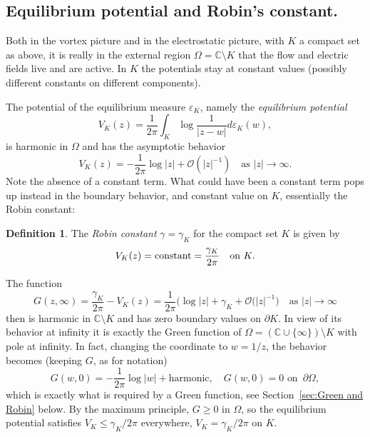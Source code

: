 \documentclass[reqno,12pt]{article}
\theoremstyle{plain}
\theoremstyle{definition}
\newtheorem{definition}{Definition}[section]
\numberwithin{equation}{section}
\numberwithin{figure}{section}
\def\C{{\mathbb C}}
\begin{document}
\subsection{Equilibrium potential and Robin's constant.}\label{sec:equilibrium potential}

Both in the vortex picture and in the electrostatic picture, with $K$ a compact set as above, 
it is really in the external region $\Omega=\C\setminus K$
that the flow and electric fields live and are active. In $K$ the potentials stay at constant values
(possibly different constants on different components).

The potential of the equilibrium measure
$\varepsilon_K$, namely the  {\it equilibrium potential} 
\begin{equation}\label{epsilonK}
V_K(z)=\frac{1}{2\pi} \int_K \log \frac{1}{|z-w|} d\varepsilon_K(w),
\end{equation}
is harmonic in $\Omega$ and has the asymptotic behavior
$$
V_K(z)=-\frac{1}{2\pi}\log |z|+\mathcal{O}(|z|^{-1}) \quad \text{as}\,\,|z|\to\infty.
$$
Note the absence of a constant term. What could have been a constant term pops up instead in the boundary 
behavior, and constant value on $K$, essentially the Robin constant:
\begin{definition}\label{def:robin}
The {\it Robin constant} $\gamma=\gamma_K$ for the compact set $K$ is given by
\begin{equation}\label{VK}
V_K(z)= {\rm constant}=\frac{\gamma_K}{2\pi} \quad \text{on}\,\, K.
\end{equation}
\end{definition}

The function 
\begin{equation}\label{external Green}
G(z,\infty)=\frac{\gamma_K}{2\pi}-V_K(z)=\frac{1}{2\pi}\Big(\log |z|+\gamma_K+\mathcal{O}(|z|^{-1}\Big) \quad \text{as}\,\,|z|\to\infty
\end{equation}
then is harmonic in $\C\setminus K$ and has zero boundary values on $\partial K$. In view of its behavior at infinity
it is exactly the {Green function} of $\Omega= (\C\cup\{\infty\})\setminus K$ with pole at infinity. 
In fact, changing the coordinate to $w=1/z$, the behavior  becomes (keeping $G$, as for notation)
$$
{G}(w,0)= -\frac{1}{2\pi}\log |w|+\text{harmonic}, \quad G(w,0)=0 \,\, \text{on }\,\partial\Omega, 
$$
which is exactly what is required by a Green function, see Section~\ref{sec:Green and Robin} below.
By the maximum principle, $G\geq 0$ in $\Omega$, so the equilibrium potential satisfies
$V_K\leq \gamma_K/2\pi$ everywhere, $V_K=\gamma_K/2\pi$ on $K$.
\end{document}
